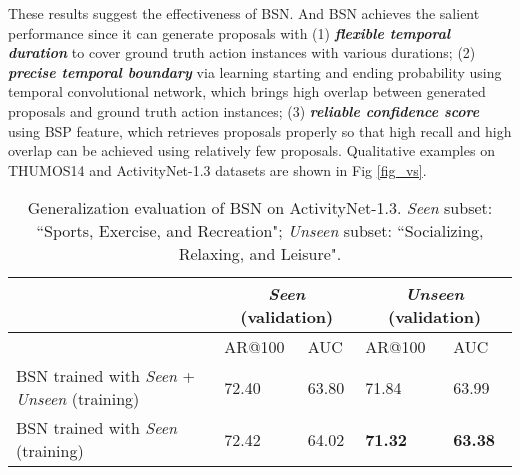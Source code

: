\documentclass[runningheads]{llncs}
\begin{document}




These results suggest the effectiveness of BSN. And BSN achieves the salient performance since it can generate proposals with (1) {\bf \emph{flexible temporal duration}} to cover ground truth action instances with various durations; (2) {\bf \emph{precise temporal boundary}} via learning starting and ending probability using temporal convolutional network, which brings high overlap between generated proposals and ground truth action instances; (3) {\bf \emph{reliable confidence score}} using BSP feature, which retrieves proposals properly so that high recall and high overlap can be achieved using relatively few proposals.
%
Qualitative examples on  THUMOS14 and ActivityNet-1.3 datasets are shown in Fig \ref{fig_vs}.

\begin{table}[tbp]
\centering
\caption{  Generalization evaluation of BSN on ActivityNet-1.3. \emph{Seen} subset: ``Sports, Exercise, and Recreation";  \emph{Unseen} subset: ``Socializing, Relaxing, and Leisure".  }
\begin{tabular}{m{5.5cm}m{1.5cm}<{\centering}m{1.5cm}<{\centering}m{1.5cm}<{\centering}m{1.5cm}<{\centering}}
\toprule
 & \multicolumn{2}{c}{\emph{Seen} (validation)} & \multicolumn{2}{c}{\emph{Unseen} (validation)}  \\
\hline   &  AR@100  & AUC & AR@100 & AUC \\
\hline 
BSN trained with \emph{Seen} + \emph{Unseen} (training)  	&  72.40  & 63.80 & 71.84 & 63.99 \\
BSN trained with \emph{Seen} (training)   			&  72.42  & 64.02 & {\bf 71.32}   & {\bf 63.38} \\
\bottomrule
\end{tabular}
\label{table_gene}
\vspace{-0.6cm}
\end{table}
\end{document}
